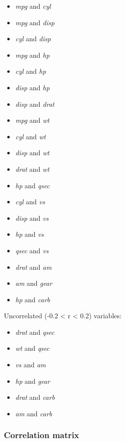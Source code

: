 \documentclass[]{article}
\begin{document}
\begin{itemize}
\item
  \emph{mpg} and \emph{cyl}
\item
  \emph{mpg} and \emph{disp}
\item
  \emph{cyl} and \emph{disp}
\item
  \emph{mpg} and \emph{hp}
\item
  \emph{cyl} and \emph{hp}
\item
  \emph{disp} and \emph{hp}
\item
  \emph{disp} and \emph{drat}
\item
  \emph{mpg} and \emph{wt}
\item
  \emph{cyl} and \emph{wt}
\item
  \emph{disp} and \emph{wt}
\item
  \emph{drat} and \emph{wt}
\item
  \emph{hp} and \emph{qsec}
\item
  \emph{cyl} and \emph{vs}
\item
  \emph{disp} and \emph{vs}
\item
  \emph{hp} and \emph{vs}
\item
  \emph{qsec} and \emph{vs}
\item
  \emph{drat} and \emph{am}
\item
  \emph{am} and \emph{gear}
\item
  \emph{hp} and \emph{carb}
\end{itemize}
Uncorrelated (-0.2 \textless{} r \textless{} 0.2) variables:

\begin{itemize}
\item
  \emph{drat} and \emph{qsec}
\item
  \emph{wt} and \emph{qsec}
\item
  \emph{vs} and \emph{am}
\item
  \emph{hp} and \emph{gear}
\item
  \emph{drat} and \emph{carb}
\item
  \emph{am} and \emph{carb}
\end{itemize}
\subsubsection{Correlation matrix}
\end{document}
